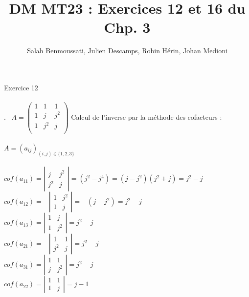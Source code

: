 \documentclass[11pt, fleqn]{report}
\begin{document}
\title{DM MT23 : Exercices 12 et 16 du Chp. 3}
\author{Salah Benmoussati, Julien Descamps, Robin Hérin, Johan Medioni}
\date {}
\maketitle

\noindent Exercice 12
\\
\\

. \, $A=\left(\begin{array}{ccc}
1 & 1 & 1\\
1 & j & j^2\\
1 & j^2 & j\\
\end{array}\right)$ \newline
\newline
Calcul de l'inverse par la méthode des cofacteurs :
\\
\\
$A=(a_{ij})_{(i,j)\in \{1,2,3\} }$
\\
\\
$ cof(a_{11}) = \left|\begin{array}{cc}j & j^2 \\j^2 & j\end{array}\right| = (j^2-j^4) = (j-j^2)(j^2+j)=j^2-j $ \\
$ cof(a_{12}) = - \left|\begin{array}{cc}1 & j^2 \\1 & j\end{array}\right| = -( j-j^2 ) = j^2-j $ \\
$ cof(a_{13}) = \left|\begin{array}{cc}1 & j \\1 & j^2\end{array}\right| = j^2-j$ \\
$ cof(a_{21}) = -\left|\begin{array}{cc}1 & 1 \\j^2 & j\end{array}\right| = j^2-j $ \\
$ cof(a_{31}) = \left|\begin{array}{cc}1 & 1 \\j & j^2\end{array}\right| = j^2-j $ \\
$ cof(a_{22}) = \left|\begin{array}{cc}1 & 1 \\1 & j\end{array}\right| = j-1 $ \\
\end{document}
